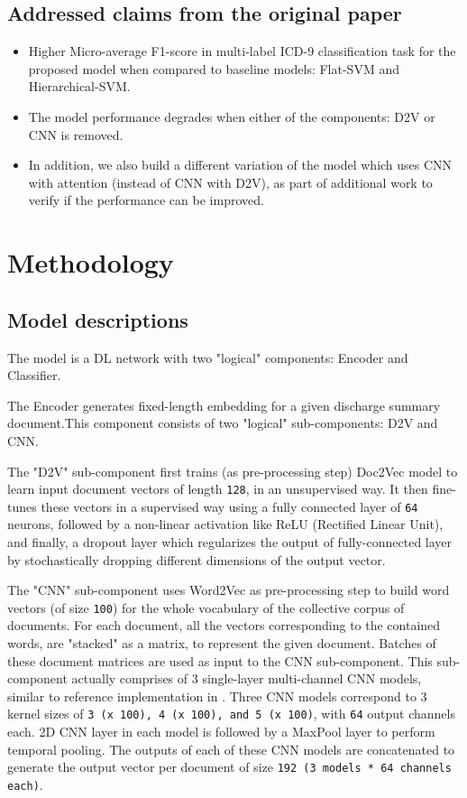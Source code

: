 \documentclass[11pt,a4paper]{article}
\begin{document}
\subsection{Addressed claims from the original paper}


\begin{itemize}
    \item Higher Micro-average F1-score in multi-label ICD-9 classification task for the proposed model when compared to baseline models: Flat-SVM and Hierarchical-SVM.
    \item The model performance degrades when either of the components: D2V or CNN is removed.
    \item In addition, we also build a different variation of the model which uses CNN with attention (instead of CNN with D2V), as part of additional work to verify if the performance can be improved.
\end{itemize}

\section{Methodology}

\subsection{Model descriptions}
The model is a DL network with two "logical" components: Encoder and Classifier.

The Encoder generates fixed-length embedding for a given discharge summary document.This component consists of two "logical" sub-components: D2V and CNN.

The "D2V" sub-component first trains (as pre-processing step) Doc2Vec model to learn input document vectors of length \texttt{128}, in an unsupervised way. It then fine-tunes these vectors in a supervised way using a fully connected layer of \texttt{64} neurons, followed by a non-linear activation like ReLU (Rectified Linear Unit), and finally, a dropout layer which regularizes the output of fully-connected layer by stochastically dropping different dimensions of the output vector.

The "CNN" sub-component uses Word2Vec as pre-processing step to build word vectors (of size \texttt{100}) for the whole vocabulary of the collective corpus of documents. For each document, all the vectors corresponding to the contained words, are "stacked" as a matrix, to represent the given document. Batches of these document matrices are used as input to the CNN sub-component. This sub-component actually comprises of 3 single-layer multi-channel CNN models, similar to reference implementation in \cite{kim2014convolutional}. Three CNN models correspond to 3 kernel sizes of \texttt{3 (x 100), 4 (x 100), and 5 (x 100)}, with \texttt{64} output channels each. 2D CNN layer in each model is followed by a MaxPool layer to perform temporal pooling. The outputs of each of these CNN models are concatenated to generate the output vector per document of size \texttt{192 (3 models * 64 channels each)}.
    
\end{document}
